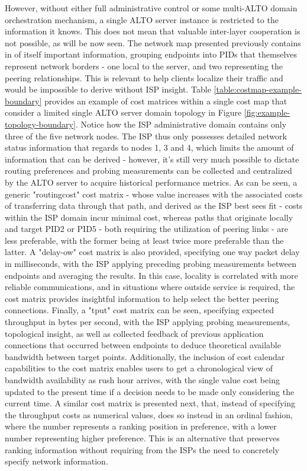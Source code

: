     However, without either full administrative control or some multi-ALTO domain orchestration mechanism, a single ALTO server instance is restricted to the information it knows.
    This does not mean that valuable inter-layer cooperation is not possible, as will be now seen.
    The network map presented previously contains in of itself important information, grouping endpoints into PIDs that themselves represent network borders - one local to the server, and two representing the peering relationships.
    This is relevant to help clients localize their traffic and would be impossible to derive without ISP insight.
    Table \ref{table:costmap-example-boundary} provides an example of cost matrices within a single cost map that consider a limited single ALTO server domain topology in Figure \ref{fig:example-topology-boundary}.
    Notice how the ISP administrative domain contains only three of the five network nodes.
    The ISP thus only possesses detailed network status information that regards to nodes 1, 3 and 4, which limits the amount of information that can be derived - however, it's still very much possible to dictate routing preferences and probing measurements can be collected and centralized by the ALTO server to acquire historical performance metrics.
    As can be seen, a generic "routingcost" cost matrix - whose value increases with the associated costs of transferring data through that path, and derived as the ISP best sees fit - costs within the ISP domain incur minimal cost, whereas paths that originate locally and target PID2 or PID5 - both requiring the utilization of peering links - are less preferable, with the former being at least twice more preferable than the latter.
    A "delay-ow" cost matrix is also provided, specifying one way packet delay in milliseconds, with the ISP applying preceding probing measurements between endpoints and averaging the results.
    In this case, locality is correlated with more reliable communications, and in situations where outside service is required, the cost matrix provides insightful information to help select the better peering connections.
    Finally, a "tput" cost matrix can be seen, specifying expected throughput in bytes per second, with the ISP applying probing measurements, topological insight, as well as collected feedback of previous application connections that occurred between endpoints to deduce theoretical available bandwidth between target points.
    Additionally, the inclusion of cost calendar capabilities to the cost matrix enables users to get a chronological view of bandwidth availability as rush hour arrives, with the single value cost being updated to the present time if a decision needs to be made only considering the current time.
    A similar cost matrix is presented next, that, instead of specifying the throughput costs as numerical values, does so instead in an ordinal fashion, where the number represents a ranking position in preference, with a lower number representing higher preference.
    This is an alternative that preserves ranking information without requiring from the ISPs the need to concretely specify network information.


